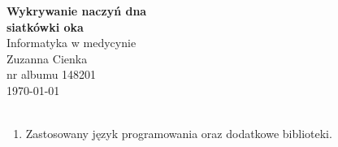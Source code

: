 \documentclass{article}
\begin{document}
\begin{center}\vspace{-1cm}
    \textbf{ \Huge Wykrywanie naczyń dna \\siatkówki oka}\\
    \LARGE Informatyka w medycynie\\
    \Large Zuzanna Cienka  \\
    \large nr albumu 148201\\
    \large \today \\~\\
\end{center}

\begin{enumerate}

    \item Zastosowany język programowania oraz dodatkowe biblioteki.
          \begin{itemize}


\end{itemize}
\end{enumerate}
\end{document}
